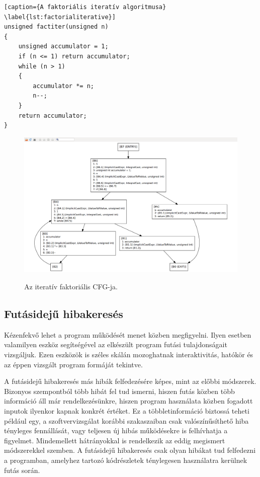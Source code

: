 \documentclass[a4paper,12pt]{report}
\begin{document}
\begin{minipage}{\linewidth}
\begin{lstlisting}[caption={A faktoriális iteratív algoritmusa}
\label{lst:factorialiterative}]
unsigned factiter(unsigned n)
{
    unsigned accumulator = 1;
    if (n <= 1) return accumulator;
    while (n > 1)
    {
        accumulator *= n;
        n--;
    }
    return accumulator;
}
\end{lstlisting}
\end{minipage}

\begin{figure}[h]
\caption{Az iteratív faktoriális CFG-ja.}
\centering
\includegraphics[scale=0.2]{factiter_cfg.png}
\label{fig:facorialiterative}
\end{figure}

\subsection{Futásidejű hibakeresés}
Kézenfekvő lehet a program működését menet közben megfigyelni. Ilyen esetben valamilyen eszköz segítségével az elkészült program futási tulajdonságait vizsgáljuk. Ezen eszközök is széles skálán mozoghatnak interaktivitás, hatókör és az éppen vizsgált program formáját tekintve.

A futásidejű hibakeresés más hibák felfedezésére képes, mint az előbbi módszerek. Bizonyos szempontból több hibát fel tud ismerni, hiszen futás közben több információ áll már rendelkezésünkre, hiszen program használata közben fogadott inputok ilyenkor kapnak konkrét értéket. Ez a többletinformáció biztossá teheti például egy, a szoftvervizsgálat korábbi szakaszaiban csak valószínűsíthető hiba tényleges fennállását, vagy teljesen új hibás működésekre is felhívhatja a figyelmet. Mindemellett hátrányokkal is rendelkezik az eddig megismert módszerekkel szemben. A futásidejű hibakeresés csak olyan hibákat tud felfedezni a programban, amelyhez tartozó kódrészletek ténylegesen használatra kerülnek futás során.
\end{document}
